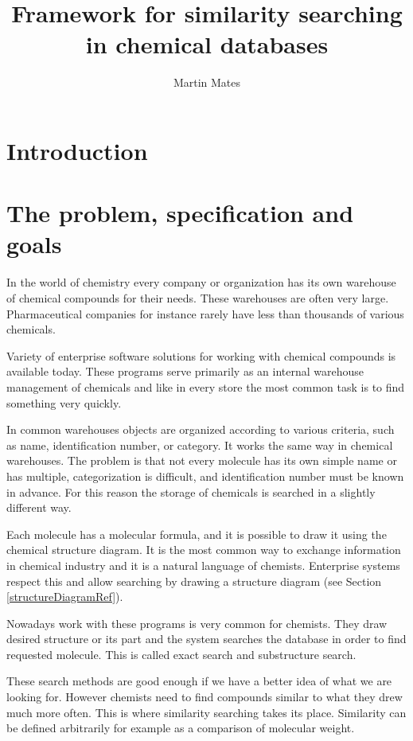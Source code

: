 \documentclass[thesis=M,english]{FITthesis}[2012/10/20]
\title{Framework for similarity searching in chemical databases}
\author{Martin Mates} %
\begin{document}

\chapter{Introduction}



\chapter{The problem, specification and goals}
In the world of chemistry every company or organization has its own warehouse of chemical compounds for their needs. These warehouses are often very large. Pharmaceutical companies for instance rarely have less than thousands of various chemicals.

Variety of enterprise software solutions for working with chemical compounds is available today. These programs serve primarily as an internal warehouse management of chemicals and like in every store the most common task is to find something very quickly.

In common warehouses objects are organized according to various criteria, such as name, identification number, or category. It works the same way in chemical warehouses. The problem is that not every molecule has its own simple name or has multiple, categorization is difficult, and identification number must be known in advance. For this reason the storage of chemicals is searched in a slightly different way.

Each molecule has a molecular formula, and it is possible to draw it using the chemical structure diagram. It is the most common way to exchange information in chemical industry and it is a natural language of chemists. Enterprise systems respect this and allow searching by drawing a structure diagram (see Section \ref{structureDiagramRef}).

Nowadays work with these programs is very common for chemists. They draw desired structure or its part and the system searches the database in order to find requested molecule. This is called exact search and substructure search.

These search methods are good enough if we have a better idea of what we are looking for. However chemists need to find compounds similar to what they drew much more often. This is where similarity searching takes its place. Similarity can be defined arbitrarily for example as a comparison of molecular weight.
\end{document}
